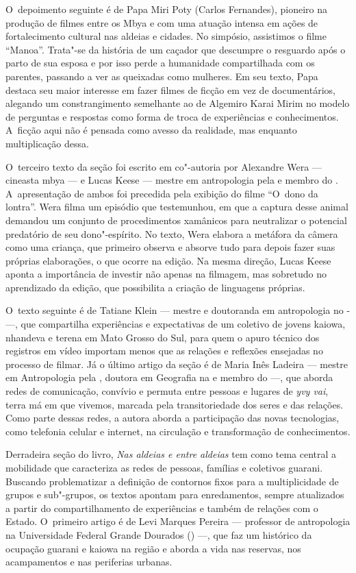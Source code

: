 O~depoimento seguinte é de Papa Miri Poty (Carlos
Fernandes), pioneiro na produção de filmes entre os Mbya e com uma
atuação intensa em ações de fortalecimento cultural nas aldeias e
cidades. No simpósio, assistimos o filme ``Manoa''. Trata"-se da história
de um caçador que descumpre o resguardo após o parto de sua esposa e
por isso perde a humanidade compartilhada com os parentes, passando a
ver as queixadas como mulheres. Em seu texto, Papa destaca seu maior
interesse em fazer filmes de ficção em vez de documentários, alegando
um constrangimento semelhante ao de Algemiro Karai Mirim no modelo de
perguntas e respostas como forma de troca de experiências e
conhecimentos. A~ficção aqui não é pensada como avesso da realidade,
mas enquanto multiplicação dessa. 

O~terceiro texto da seção foi escrito em co"-autoria por Alexandre Wera ---
cineasta mbya --- e Lucas Keese --- mestre em antropologia pela  e
membro do . A~apresentação de ambos foi precedida pela exibição do
filme ``O~dono da lontra''. Wera filma um episódio que testemunhou, em
que a captura desse animal demandou um conjunto de procedimentos
xamânicos para neutralizar o potencial predatório de seu dono"-espírito.
No texto, Wera elabora a metáfora da câmera como uma criança, que
primeiro observa e absorve tudo para depois fazer suas próprias
elaborações, o que ocorre na edição. Na mesma direção, Lucas Keese
aponta a importância de investir não apenas na filmagem, mas sobretudo
no aprendizado da edição, que possibilita a criação de linguagens
próprias. 

O~texto seguinte é de Tatiane Klein --- mestre e doutoranda em
antropologia no - ---, que compartilha experiências e
expectativas de um coletivo de jovens kaiowa, nhandeva e terena em Mato
Grosso do Sul, para quem o apuro técnico dos registros em vídeo
importam menos que as relações e reflexões ensejadas no processo de
filmar. Já o último artigo da seção é de Maria Inês Ladeira --- mestre em
Antropologia pela , doutora em Geografia na  e membro do  ---,
que aborda redes de comunicação, convívio e permuta entre pessoas e
lugares de \emph{yvy vai}, terra má em que vivemos, marcada pela
transitoriedade dos seres e das relações. Como parte dessas redes, a
autora aborda a participação das novas tecnologias, como telefonia
celular e internet, na circulação e transformação de conhecimentos.

Derradeira seção do livro, \emph{Nas aldeias e entre aldeias} tem como tema
central a mobilidade que caracteriza as redes de pessoas, famílias e
coletivos guarani. Buscando problematizar a definição de contornos
fixos para a multiplicidade de grupos e sub"-grupos, os textos apontam
para enredamentos, sempre atualizados a partir do compartilhamento de
experiências e também de relações com o Estado. O~primeiro artigo é de
Levi Marques Pereira --- professor de antropologia na Universidade
Federal Grande Dourados () ---, que faz um histórico da ocupação
guarani e kaiowa na região e aborda a vida nas reservas, nos
acampamentos e nas periferias urbanas. 

